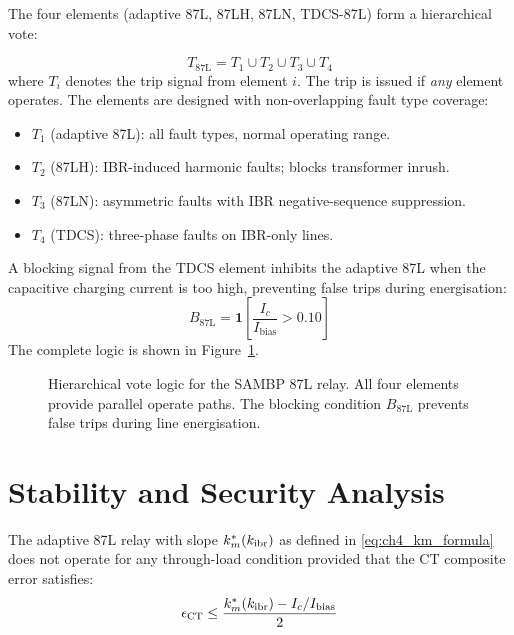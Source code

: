 The four elements (adaptive 87L, 87LH, 87LN, TDCS-87L) form a
hierarchical vote:

\begin{equation}
  T_\mathrm{87L} = T_1 \cup T_2 \cup T_3 \cup T_4
  \label{eq:ch4_vote}
\end{equation}
where $T_i$ denotes the trip signal from element $i$. The trip is issued
if \emph{any} element operates. The elements are designed with non-overlapping
fault type coverage:
\begin{itemize}
\item $T_1$ (adaptive 87L): all fault types, normal operating range.
\item $T_2$ (87LH): IBR-induced harmonic faults; blocks transformer inrush.
\item $T_3$ (87LN): asymmetric faults with IBR negative-sequence suppression.
\item $T_4$ (TDCS): three-phase faults on IBR-only lines.
\end{itemize}

A blocking signal from the TDCS element inhibits the adaptive 87L when
the capacitive charging current is too high, preventing false trips during
energisation:
\begin{equation}
  B_\mathrm{87L} = \mathbf{1}\!\left[\frac{I_c}{I_\mathrm{bias}} > 0.10\right]
  \label{eq:ch4_block}
\end{equation}
The complete logic is shown in Figure~\ref{fig:ch4_logic}.

\begin{figure}[htbp]
  \centering
  
  \caption{Hierarchical vote logic for the SAMBP 87L relay.
           All four elements provide parallel operate paths.
           The blocking condition $B_\mathrm{87L}$ prevents false
           trips during line energisation.}
  \label{fig:ch4_logic}
\end{figure}

\section{Stability and Security Analysis}
\label{sec:ch4_stability}

\begin{proposition}
\label{prop:ch4_stability}
The adaptive 87L relay with slope $k_m^\ast(k_{\mathrm{ibr}})$ as defined in
\eqref{eq:ch4_km_formula} does not operate for any through-load condition
provided that the CT composite error satisfies:
\begin{equation}
  \epsilon_\mathrm{CT} \leq \frac{k_m^\ast(k_{\mathrm{ibr}}) - I_c/I_\mathrm{bias}}{2}
  \label{eq:ch4_stability_condition}
\end{equation}
\end{proposition}

